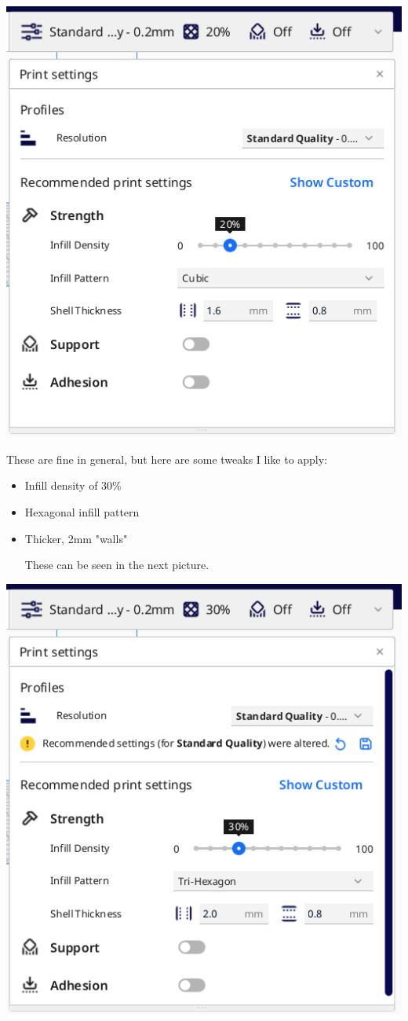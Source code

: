 \documentclass[a4paper,11pt]{article}
\begin{document}
\begin{center}
\includegraphics[width=.9\linewidth]{img/cura/7.png}
\end{center}

These are fine in general, but here are some tweaks I like to apply:
\begin{itemize}
\item Infill density of 30\%
\item Hexagonal infill pattern
\item Thicker, 2mm "walls"

These can be seen in the next picture.
\end{itemize}

\begin{center}
\includegraphics[width=.7\linewidth]{img/cura/8.png}
\end{center}
\end{document}
